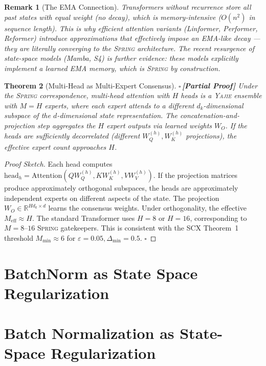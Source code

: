 \documentclass[12pt,a4paper]{article}
\newtheorem{theorem}{Theorem}[section]
\newtheorem{remark}[theorem]{Remark}
\theoremstyle{definition}
\newcommand{\rigorPartial}{{\color{rigorcolor}$\square$\,\textbf{[Partial Proof]}}}
\newcommand{\Yajie}{\textsc{Yajie}}
\newcommand{\Spring}{\textsc{Spring}}
\newcommand{\SCX}{\textsc{SCX}}
\newcommand{\R}{\mathbb{R}}
\begin{document}
\begin{remark}[The EMA Connection]
Transformers without recurrence store all past states with equal weight (no decay), which is memory-intensive ($O(n^2)$ in sequence length). This is why efficient attention variants (Linformer, Performer, Reformer) introduce approximations that effectively impose an EMA-like decay — they are literally converging to the \Spring{} architecture. The recent resurgence of state-space models (Mamba, S4) is further evidence: these models explicitly implement a learned EMA memory, which is \Spring{} by construction.
\end{remark}

\begin{theorem}[Multi-Head as Multi-Expert Consensus]\label{thm:multihead_yajie}
\rigorPartial
Under the \Spring{} correspondence, multi-head attention with $H$ heads is a \Yajie{} ensemble with $M = H$ experts, where each expert attends to a different $d_k$-dimensional subspace of the $d$-dimensional state representation. The concatenation-and-projection step aggregates the $H$ expert outputs via learned weights $W_O$. If the heads are sufficiently decorrelated (different $W_Q^{(h)}, W_K^{(h)}$ projections), the effective expert count approaches $H$.
\end{theorem}

\begin{proof}[Proof Sketch]
Each head computes $\text{head}_h = \text{Attention}(QW_Q^{(h)}, KW_K^{(h)}, VW_V^{(h)})$. If the projection matrices produce approximately orthogonal subspaces, the heads are approximately independent experts on different aspects of the state. The projection $W_O \in \R^{H d_k \times d}$ learns the consensus weights. Under orthogonality, the effective $M_{\text{eff}} \approx H$. The standard Transformer uses $H = 8$ or $H = 16$, corresponding to $M = 8$–$16$ \Spring{} gatekeepers. This is consistent with the \SCX{} Theorem~1 threshold $M_{\min} \approx 6$ for $\varepsilon = 0.05, \Delta_{\min} = 0.5$. \hfill $\square$
\end{proof}

\section{BatchNorm as State Space Regularization}
\section{Batch Normalization as State-Space Regularization}
\label{sec:batchnorm}
\end{document}
